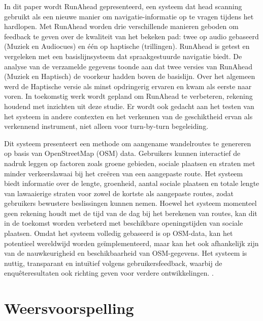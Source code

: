     \hspace{2cm}

    \textcite{Gallo2020} 
    In dit paper wordt RunAhead gepresenteerd, 
    een systeem dat head scanning gebruikt als een nieuwe manier om navigatie-informatie op te vragen tijdens het hardlopen. 
    Met RunAhead worden drie verschillende manieren geboden om feedback te geven over de kwaliteit van het bekeken pad: 
    twee op audio gebaseerd (Muziek en Audiocues) en één op haptische (trillingen). 
    RunAhead is getest en vergeleken met een basislijnsysteem dat spraakgestuurde navigatie biedt. 
    De analyse van de verzamelde gegevens toonde aan dat twee versies van RunAhead (Muziek en Haptisch) de voorkeur hadden boven de basislijn. 
    Over het algemeen werd de Haptische versie als minst opdringerig ervaren en kwam als eerste naar voren. 
    In toekomstig werk wordt gepland om RunAhead te verbeteren, rekening houdend met inzichten uit deze studie. 
    Er wordt ook gedacht aan het testen van het systeem in andere contexten en het verkennen van de geschiktheid ervan als verkennend instrument, 
    niet alleen voor turn-by-turn begeleiding.

    \hspace{2cm}

    \textcite{Novack2018} 
    Dit systeem presenteert een methode om aangename wandelroutes te genereren op basis van OpenStreetMap (OSM) data. 
    Gebruikers kunnen interactief de nadruk leggen op factoren zoals groene gebieden, 
    sociale plaatsen en straten met minder verkeerslawaai bij het creëren van een aangepaste route. 
    Het systeem biedt informatie over de lengte, groenheid, aantal sociale plaatsen en totale lengte van lawaaierige straten 
    voor zowel de kortste als aangepaste routes, zodat gebruikers bewustere beslissingen kunnen nemen. 
    Hoewel het systeem momenteel geen rekening houdt met de tijd van de dag bij het berekenen van routes, 
    kan dit in de toekomst worden verbeterd met beschikbare openingstijden van sociale plaatsen. 
    Omdat het systeem volledig gebaseerd is op OSM-data, kan het potentieel wereldwijd worden geïmplementeerd, 
    maar kan het ook afhankelijk zijn van de nauwkeurigheid en beschikbaarheid van OSM-gegevens. 
    Het systeem is nuttig, transparant en intuïtief volgens gebruikersfeedback, 
    waarbij de enquêteresultaten ook richting geven voor verdere ontwikkelingen.
    \autocite{Novack2018}.

    \section{Weersvoorspelling}

